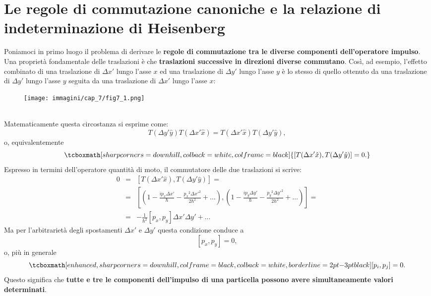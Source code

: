 \documentclass[a4paper,12pt,oneside]{book}
\begin{document}
\section[Le regole di commutazione canoniche e la relazione di indeterminazione di Heisenberg]{Le regole di commutazione canoniche e la relazione di indeterminazione di Heisenberg}
Poniamoci in primo luogo il problema di derivare le \textbf{regole di commutazione tra le diverse componenti dell'operatore impulso}.\\
Una proprietà fondamentale delle traslazioni è che \textbf{traslazioni successive in direzioni diverse commutano}. Così, ad esempio, l'effetto combinato di una traslazione di $\Delta x'$ lungo l'asse $x$ ed una traslazione di $\Delta y'$ lungo l'asse $y$ è lo stesso di quello ottenuto da una traslazione di $\Delta y'$ lungo l'asse $y$ seguita da una traslazione di $\Delta x'$ lungo l'asse $x$:\\
\begin{figure}[!htbp]
\begin{center}
\texttt{[image: immagini/cap\_7/fig7\_1.png]}
\end{center}
\end{figure}\\
Matematicamente questa circostanza si esprime come:
	\begin{equation}
		T(\Delta y'\hat{y})T(\Delta x'\hat{x})= T(\Delta x'\hat{x})T(\Delta y'\hat{y}),
	\end{equation}
o, equivalentemente
	\begin{equation}
		\tcboxmath[sharp corners=downhill, colback=white, colframe=black]{
			\left[ T(\Delta x'\hat{x}), T(\Delta y'\hat{y})\right] =0.
			}
	\end{equation}
Espresso in termini dell'operatore quantità di moto, il commutatore delle due traslazioni si scrive:
	\begin{eqnarray}
		0 & = & \left[ T(\Delta x'\hat{x}), T(\Delta y'\hat{y})\right] =   \nonumber \\
		 & = & \left[\left( 1-\frac{i p_x \Delta x'}{\hbar}-\frac{ {p_x} ^2 {\Delta x'}^2}{2\hbar ^2}+\dots \right), \left( 1-\frac{i p_y \Delta y'}{\hbar}-\frac{ {p_y} ^2 {\Delta y'}^2}{2\hbar ^2}+\dots\right) \right] = \nonumber  \\
		& = & -\frac{1}{\hbar ^2}\left[p_x, p_y \right]\Delta x' \Delta y' + \dots
	\end{eqnarray}
Ma per l'arbitrarietà degli spostamenti $\Delta x'$ e  $\Delta y'$ questa condizione conduce a
	\begin{equation}
		\left[p_x , p_y\right] =0,
	\end{equation}
o, più in generale
	\begin{equation}
		\tcboxmath[enhanced, sharp corners=downhill, colframe=black, colback=white, borderline={2pt}{-3pt}{black}]{
			\left[p_i , p_j\right] =0.
			}
	\end{equation}
Questo significa che \textbf{tutte e tre le componenti dell'impulso di una particella possono avere simultaneamente valori determinati}.\\
\end{document}
